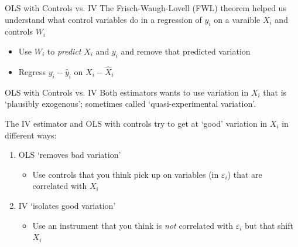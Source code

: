 \documentclass[aspectratio=169,t,11pt,table]{beamer}
\begin{document}
\begin{frame}{OLS with Controls vs. IV}
  The Frisch-Waugh-Lovell (FWL) theorem helped us understand what control variables do in a regression of $y_i$ on a varaible $X_i$ and controls $W_i$
  \begin{itemize}
    \item Use $W_i$ to \emph{predict} $X_i$ and $y_i$ and remove that predicted variation
    
    \item Regress $y_i - \hat{y}_i$ on $X_i - \hat{X}_i$
  \end{itemize}
\end{frame}

\begin{frame}{OLS with Controls vs. IV}
  Both estimators wants to use variation in $X_i$ that is `plausibly exogenous'; sometimes called `quasi-experimental variation'. 
  
  \bigskip
  The IV estimator and OLS with controls try to get at `good' variation in $X_i$ in different ways:

  \bigskip
  \begin{enumerate}
    \item OLS `removes bad variation'
    \begin{itemize}
      \item Use controls that you think pick up on variables (in $\varepsilon_i$) that are correlated with $X_i$
      
    \end{itemize}
    
    \medskip
    \item IV `isolates good variation'
    \begin{itemize}
      \item Use an instrument that you think is \emph{not} correlated with $\varepsilon_i$ but that shift $X_i$ 
      
    \end{itemize}
  \end{enumerate}
\end{frame}
\end{document}
